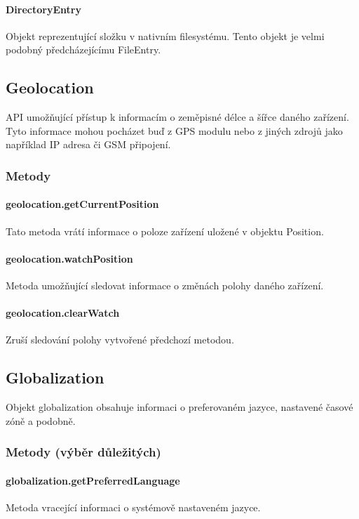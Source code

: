 \paragraph{DirectoryEntry}
Objekt reprezentující složku v nativním filesystému. Tento objekt je velmi podobný předcházejícímu FileEntry.

\subsection{Geolocation}
API umožňující přístup k informacím o zeměpisné délce a šířce daného zařízení. Tyto informace mohou pocházet buď z GPS modulu nebo z jiných zdrojů jako například IP adresa či GSM připojení.

\subsubsection{Metody}
\paragraph{geolocation.getCurrentPosition}
Tato metoda vrátí informace o poloze zařízení uložené v objektu Position.

\paragraph{geolocation.watchPosition}
Metoda umožňující sledovat informace o změnách polohy daného zařízení.

\paragraph{geolocation.clearWatch}
Zruší sledování polohy vytvořené předchozí metodou.

\subsection{Globalization}
Objekt globalization obsahuje informaci o preferovaném jazyce, nastavené časové zóně a podobně.

\subsubsection{Metody (výběr důležitých)}
\paragraph{globalization.getPreferredLanguage}
Metoda vracející informaci o systémově nastaveném jazyce.

